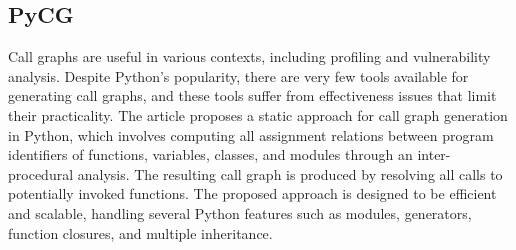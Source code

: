 \subsection{PyCG}
Call graphs are useful in various contexts, including profiling and vulnerability analysis.
Despite Python's popularity, there are very few tools available for generating call graphs, and these tools suffer from effectiveness issues that limit their practicality.
The article proposes a static approach for call graph generation in Python, which involves computing all assignment relations between program identifiers of functions, variables, classes, and modules through an inter-procedural analysis.
The resulting call graph is produced by resolving all calls to potentially invoked functions.
The proposed approach is designed to be efficient and scalable, handling several Python features such as modules, generators, function closures, and multiple inheritance. \cite{PyCG_2021}


